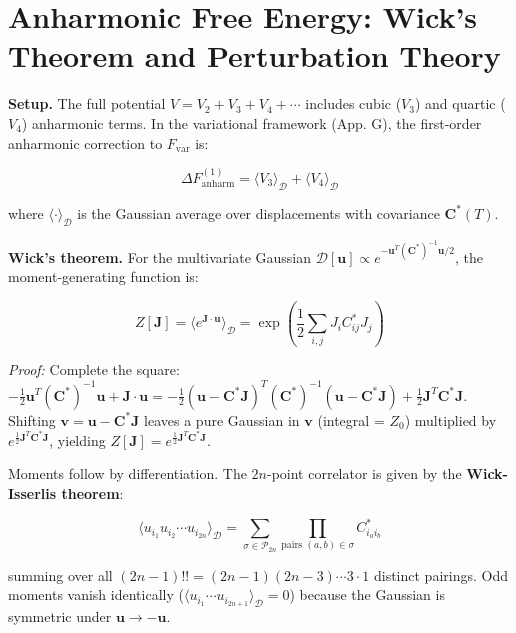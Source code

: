 \documentclass[aps,prb,reprint,amsmath,amssymb,floatfix]{revtex4-2}
\begin{document}
\section{Anharmonic Free Energy: Wick's Theorem and
Perturbation
Theory}\label{appendix-i-anharmonic-free-energy-wicks-theorem-and-perturbation-theory}

\textbf{Setup.} The full potential \(V = V_2 + V_3 + V_4 + \cdots\)
includes cubic (\(V_3\)) and quartic (\(V_4\)) anharmonic terms. In the
variational framework (App. G), the first-order anharmonic correction to
\(F_\text{var}\) is:

\begin{equation*}
\Delta F_\text{anharm}^{(1)} = \langle V_3\rangle_\mathcal{D} + \langle V_4\rangle_\mathcal{D}
\end{equation*}

where \(\langle\cdot\rangle_\mathcal{D}\) is the Gaussian average over
displacements with covariance \(\mathbf{C}^*(T)\).

\textbf{Wick's theorem.} For the multivariate Gaussian
\(\mathcal{D}[\mathbf{u}] \propto e^{-\mathbf{u}^T(\mathbf{C}^*)^{-1}\mathbf{u}/2}\),
the moment-generating function is:

\begin{equation*}
Z[\mathbf{J}] = \langle e^{\mathbf{J}\cdot\mathbf{u}}\rangle_\mathcal{D} = \exp\!\left(\frac{1}{2}\sum_{i,j}J_iC_{ij}^*J_j\right)
\end{equation*}

\emph{Proof:} Complete the square:
\(-\frac{1}{2}\mathbf{u}^T(\mathbf{C}^*)^{-1}\mathbf{u} + \mathbf{J}\cdot\mathbf{u} = -\frac{1}{2}(\mathbf{u}-\mathbf{C}^*\mathbf{J})^T(\mathbf{C}^*)^{-1}(\mathbf{u}-\mathbf{C}^*\mathbf{J}) + \frac{1}{2}\mathbf{J}^T\mathbf{C}^*\mathbf{J}\).
Shifting \(\mathbf{v} = \mathbf{u}-\mathbf{C}^*\mathbf{J}\) leaves a
pure Gaussian in \(\mathbf{v}\) (integral = \(Z_0\)) multiplied by
\(e^{\frac{1}{2}\mathbf{J}^T\mathbf{C}^*\mathbf{J}}\), yielding
\(Z[\mathbf{J}] = e^{\frac{1}{2}\mathbf{J}^T\mathbf{C}^*\mathbf{J}}\).

Moments follow by differentiation. The \(2n\)-point correlator is given
by the \textbf{Wick-Isserlis theorem}:

\begin{equation*}
\langle u_{i_1}u_{i_2}\cdots u_{i_{2n}}\rangle_\mathcal{D} = \sum_{\sigma\in\mathcal{P}_{2n}}\prod_{\text{pairs }(a,b)\in\sigma} C_{i_ai_b}^*
\end{equation*}

summing over all \((2n-1)!! = (2n-1)(2n-3)\cdots 3\cdot 1\) distinct
pairings. Odd moments vanish identically
(\(\langle u_{i_1}\cdots u_{i_{2n+1}}\rangle_\mathcal{D} = 0\)) because
the Gaussian is symmetric under \(\mathbf{u}\to-\mathbf{u}\).
\end{document}
